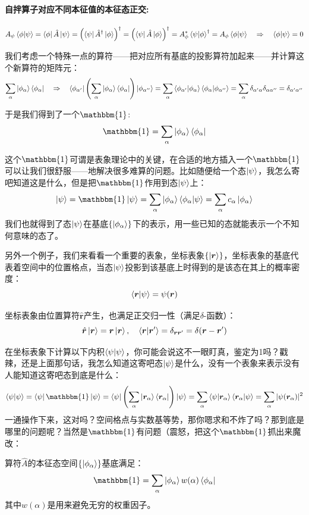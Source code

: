 \paragraph*{自拌算子对应不同本征值的本征态正交:}
\[A_{\psi}\bra{\phi}\ket{\psi}=\bra{\phi}\hat{A}\ket{\psi}=\left(\bra{\psi}\hat{A}^{\dagger}\ket{\phi}\right)^{\dagger}=\left(\bra{\psi}\hat{A}\ket{\phi}\right)^{\dagger}=A_{\phi}^*\bra{\psi}\ket{\phi}^{\dagger}=A_{\phi}\bra{\phi}\ket{\psi} \quad \Rightarrow \quad \bra{\phi}\ket{\psi}=0\]

我们考虑一个特殊一点的算符——把对应所有基底的投影算符加起来——并计算这个新算符的矩阵元：
\[\sum_{\alpha}\ket{\phi_{\alpha}}\bra{\phi_{\alpha}} \quad \Rightarrow \quad \bra{\phi_{\alpha'}}\left(\sum_{\alpha}\ket{\phi_{\alpha}}\bra{\phi_{\alpha}}\right)\ket{\phi_{\alpha''}}=\sum_{\alpha}\bra{\phi_{\alpha'}}\ket{\phi_{\alpha}}\bra{\phi_{\alpha}}\ket{\phi_{\alpha''}}=\sum_{\alpha}\delta_{\alpha'\alpha}\delta_{\alpha\alpha''}=\delta_{\alpha'\alpha''}\]

于是我们得到了一个$\mathbbm{1}$:
\[\mathbbm{1}=\sum_{\alpha}\ket{\phi_{\alpha}}\bra{\phi_{\alpha}}\]

这个$\mathbbm{1}$可谓是表象理论中的关键，在合适的地方插入一个$\mathbbm{1}$可以让我们很舒服——地解决很多难算的问题。比如随便给一个态$\ket{\psi}$，我怎么寄吧知道这是什么，但是把$\mathbbm{1}$作用到态$\ket{\psi}$上：
\[\ket{\psi}=\mathbbm{1}\ket{\psi}=\sum_{\alpha}\ket{\phi_{\alpha}}\bra{\phi_{\alpha}}\ket{\psi}=\sum_{\alpha}c_{\alpha}\ket{\phi_{\alpha}}\]
我们也就得到了态$\ket{\psi}$在基底$\{\ket{\phi_{\alpha}}\}$下的表示，用一些已知的态就能表示一个不知何意味的态了。

另外一个例子，我们来看看一个重要的表象，坐标表象$\{\ket{\bm{r}}\}$，坐标表象的基底代表着空间中的位置格点，当态$\ket{\psi}$投影到该基底上时得到的是该态在其上的概率密度：
\[\bra{\bm{r}}\ket{\psi}=\psi(\bm{r})\]

坐标表象由位置算符$\hat{\bm{r}}$产生，也满足正交归一性（满足$\delta$-函数）：
\[\hat{\bm{r}}\ket{\bm{r}}=\bm{r}\ket{\bm{r}}, \quad \bra{\bm{r}}\ket{\bm{r}'}=\delta_{\bm{r}\bm{r}'}=\delta(\bm{r}-\bm{r}')\]

在坐标表象下计算以下内积$\bra{\psi}\ket{\psi}$，你可能会说这不一眼盯真，鉴定为1吗？戳辣，还是上面那句话，我怎么知道这寄吧态$\ket{\psi}$是什么，没有一个表象来表示没有人能知道这寄吧态到底是什么：
\[\bra{\psi}\ket{\psi}=\bra{\psi}\mathbbm{1}\ket{\psi}=\bra{\psi}\left(\sum_{\alpha}\ket{\bm{r}_{\alpha}}\bra{\bm{r}_{\alpha}}\right)\ket{\psi}=\sum_{\alpha}\bra{\psi}\ket{\bm{r}_{\alpha}}\bra{\bm{r}_{\alpha}}\ket{\psi}=\sum_{\alpha}|\psi(\bm{r}_{\alpha})|^2\]
一通操作下来，这对吗？空间格点与实数基等势，那你嗯求和不炸了吗？那到底是哪里的问题呢？当然是$\mathbbm{1}$有问题（震怒，把这个$\mathbbm{1}$抓出来魔改：
\begin{theorem}[完备性公式]
算符$\hat{A}$的本征态空间$\{\ket{\phi_{\alpha}}\}$基底满足：
\[\mathbbm{1}=\sum_{\alpha}\ket{\phi_{\alpha}}w(\alpha)\bra{\phi_{\alpha}}\]
其中$w(\alpha)$是用来避免无穷的权重因子。
\end{theorem}

